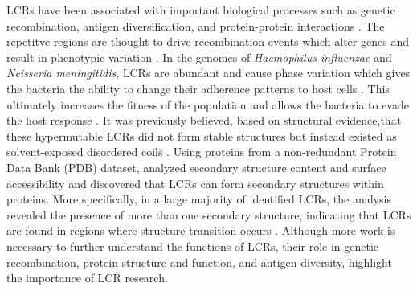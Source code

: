 \documentclass[10pt]{article}
\begin{document}
LCRs have been associated with important biological processes such as genetic recombination, antigen diversification, and
protein-protein interactions \citep{karlin2002amino, verstrepen2005intragenic, kumari2015low}. The repetitve regions are thought
to drive recombination events which alter genes and result in phenotypic variation \citep{verstrepen2005intragenic}. In the genomes of
\textit{Haemophilus influenzae} and \textit{Neisseria meningitidis}, LCRs are abundant and cause phase variation which gives the bacteria the
ability to change their adherence patterns to host cells \citep{bayliss2001simple}. This ultimately increases the fitness of the population and allows the bacteria to evade the host response \citep{bayliss2001simple}. It was previously believed, based on structural evidence,that these hypermutable LCRs did not form stable structures but instead existed as solvent-exposed disordered coils \citep{wootton1993statistics, huntley2002simple, depristo2006abundance}. Using proteins from a non-redundant Protein Data Bank (PDB) dataset, \citet{kumari2015low} analyzed secondary structure content and surface accessibility and discovered that LCRs
can form secondary structures within proteins. More specifically, in a large majority of identified LCRs, the analysis revealed
the presence of more than one secondary structure, indicating that LCRs are found in regions where structure transition occurs
\citep{kumari2015low}. Although more work is necessary to further understand the functions of LCRs, their role in genetic
recombination, protein structure and function, and antigen diversity, highlight the importance of LCR research.
\end{document}
